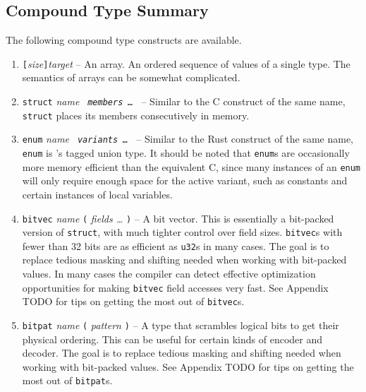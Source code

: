 \subsection{Compound Type Summary}

The following compound type constructs are available.

\begin{enumerate}

\item {\tt [}{\em size}{\tt ]}{\em target} -- An array. An ordered
sequence of values of a single type. The semantics of arrays can be
somewhat complicated.

\item {\tt struct} {\em name} {\tt \string{} {\em members \dots} {\tt \string}}
-- Similar to the C construct of the same name, {\tt struct} places its
members consecutively in memory.

\item {\tt enum} {\em name} {\tt \string{} {\em variants \dots} {\tt \string}}
-- Similar to the Rust construct of the same name, {\tt enum} is \gx{}'s
tagged union type. It should be noted that {\tt enum}s are occasionally
more memory efficient than the equivalent C, since many instances of
an {\tt enum} will only require enough space for the active variant,
such as constants and certain instances of local variables.

\item {\tt bitvec} {\em name} {\tt (} {\em fields \dots} {\tt )} -- A
bit vector. This is essentially a bit-packed version of {\tt struct},
with much tighter control over field sizes. {\tt bitvec}s with fewer
than 32 bits are as efficient as {\tt u32}s in many cases. The goal is to
replace tedious masking and shifting needed when working with bit-packed
values. In many cases the compiler can detect effective optimization
opportunities for making {\tt bitvec} field accesses very fast. See
Appendix TODO for tips on getting the most out of {\tt bitvec}s.

\item {\tt bitpat} {\em name} {\tt (} {\em pattern} {\tt )} -- A type that
scrambles logical bits to get their physical ordering. This can be useful
for certain kinds of encoder and decoder. The goal is to replace tedious
masking and shifting needed when working with bit-packed values. See
Appendix TODO for tips on getting the most out of {\tt bitpat}s.

\end{enumerate}
